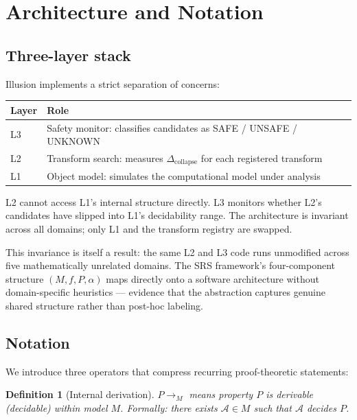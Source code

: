 \documentclass[11pt,a4paper]{article}
\newtheorem{definition}[theorem]{Definition}
\newcommand{\derivM}{\rightarrow_M}           %
\newcommand{\Dcollapse}{\Delta_{\mathrm{collapse}}}
\begin{document}
\section{Architecture and Notation}
\label{sec:arch}

\subsection{Three-layer stack}

Illusion implements a strict separation of concerns:

\begin{center}
\begin{tabular}{@{}lp{10cm}@{}}
\toprule
Layer & Role \\
\midrule
L3 & Safety monitor: classifies candidates as SAFE / UNSAFE / UNKNOWN \\
L2 & Transform search: measures $\Dcollapse$ for each registered transform \\
L1 & Object model: simulates the computational model under analysis \\
\bottomrule
\end{tabular}
\end{center}

L2 cannot access L1's internal structure directly. L3 monitors whether L2's candidates have slipped into L1's decidability range. The architecture is invariant across all domains; only L1 and the transform registry are swapped.

This invariance is itself a result: the same L2 and L3 code runs unmodified across five mathematically unrelated domains. The SRS framework's four-component structure $(M, f, P, \alpha)$ maps directly onto a software architecture without domain-specific heuristics --- evidence that the abstraction captures genuine shared structure rather than post-hoc labeling.

\subsection{Notation}

We introduce three operators that compress recurring proof-theoretic statements:

\begin{definition}[Internal derivation]
$P \derivM$ means property $P$ is derivable (decidable) within model $M$. Formally: there exists $\mathcal{A} \in M$ such that $\mathcal{A}$ decides $P$.
\end{definition}
\end{document}
